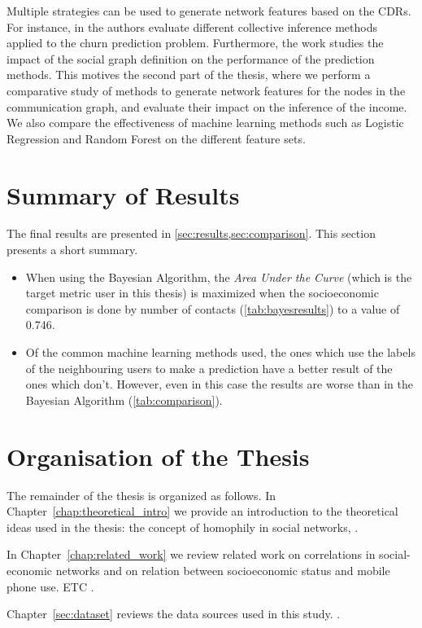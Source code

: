 Multiple strategies can be used to generate network features based on the CDRs. For instance, in \cite{oskarsdottir2016} the authors evaluate different collective inference methods applied to the churn prediction problem. Furthermore, the work \cite{oskarsdottir2017social} studies the impact of the social graph definition on the performance of the prediction methods. This motives the second part of the thesis, where we perform a comparative study of methods to generate network features for the nodes in the communication graph, and evaluate their impact on the inference of the income. We also compare the effectiveness of machine learning methods such as Logistic Regression and Random Forest on the different feature sets.

\section{Summary of Results}

The final results are presented in \cref{sec:results,sec:comparison}. This section presents a short summary.
\begin{itemize}
	\item When using the Bayesian Algorithm, the \emph{Area Under the Curve} (which is the target metric user in this thesis) is maximized when the socioeconomic comparison is done by number of contacts (\cref{tab:bayesresults}) to a value of \num{0.746}.
	\item Of the common machine learning methods used, the ones which use the labels of the neighbouring users to make a prediction have a better result of the ones which don't. However, even in this case the results are worse than in the Bayesian Algorithm (\cref{tab:comparison}).
\end{itemize}

\section{Organisation of the Thesis}

The remainder of the thesis is organized as follows.
In Chapter~\ref{chap:theoretical_intro} we provide an introduction to the theoretical ideas used in the thesis: the concept of homophily in social networks, .

In Chapter~\ref{chap:related_work} we review related work on correlations in social-economic networks and on relation between socioeconomic status and mobile phone use. ETC .

Chapter~\ref{sec:dataset} reviews the data sources used in this study. .



